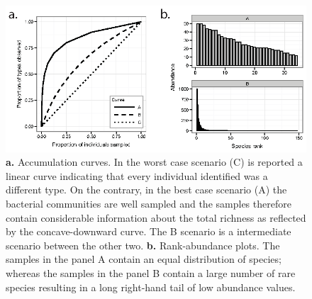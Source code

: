 \begin{figure}[!tb]
	\centering
	\includegraphics[width=\textwidth]{./figures/Introduction/rank_accumul1}
  	\caption{\textbf{a.} Accumulation curves. In the worst case scenario (C) is reported a linear curve indicating that every individual identified was a different type. On the contrary, in the best case scenario (A) the bacterial communities are well sampled and the samples therefore contain considerable information about the total richness as reflected by the concave-downward curve. The B scenario is a intermediate scenario between the other two. \textbf{b.} Rank-abundance plots. The samples in the panel A contain an equal distribution of species; whereas the samples in the panel B contain a large number of rare species resulting in a long right-hand tail of low abundance values.\label{fig:accrank}}
\end{figure}

